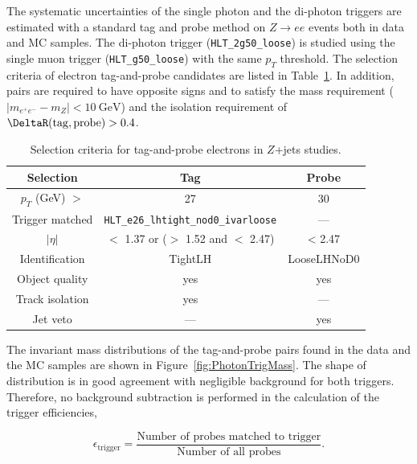 The systematic uncertainties of the single photon and the di-photon triggers are estimated with a standard tag and probe method on $Z\rightarrow ee$ events both in data and MC samples. The di-photon trigger (\texttt{HLT\_2g50\_loose}) is studied using the single muon trigger (\texttt{HLT\_g50\_loose}) with the same $p_{T}$ threshold. The selection criteria of electron tag-and-probe candidates are listed in Table~\ref{tab:ZeeSelection}. In addition, pairs are required to have opposite signs and to satisfy the mass requirement ($|m_{e^{+}e^{-}} - m_{Z}| < 10~\si{\GeV}$) and the isolation requirement of $\DeltaR(\mathrm{tag}, \mathrm{probe}) > 0.4$. 

\begin{table}[!htb]
	\centering
	\begin{tabular}{ccc}
		\hline
		\hline
		Selection & Tag & Probe \\
		\hline
		$p_{T}$ (GeV) $>$ & 27 & 30 \\
		Trigger matched & \texttt{HLT\_e26\_lhtight\_nod0\_ivarloose} & --- \\
		$|\eta|$ & $<$ 1.37 or ($>$ 1.52 and $<$ 2.47) & < 2.47 \\
		Identification & TightLH & LooseLHNoD0 \\
		Object quality & yes & yes \\
		Track isolation & yes & --- \\
		Jet veto & --- & yes \\
		\hline
		\hline
	\end{tabular}
	\caption{Selection criteria for tag-and-probe electrons in $Z$+jets studies.}
	\label{tab:ZeeSelection}
\end{table}

The invariant mass distributions of the tag-and-probe pairs found in the data and the MC samples are shown in Figure~\ref{fig:PhotonTrigMass}. The shape of distribution is in good agreement with negligible background for both triggers. Therefore, no background subtraction is performed in the calculation of the trigger efficiencies, 

\begin{equation}
	\label{eq:TrigEff}
    \epsilon_{\mathrm{trigger}} = \frac{\textrm{Number of probes matched to trigger}}{\textrm{Number of all probes}}.
\end{equation}

